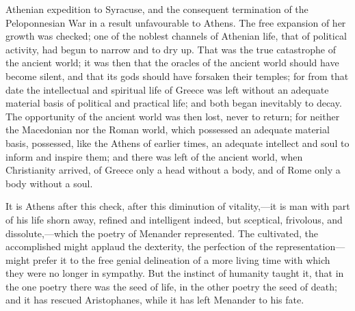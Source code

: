 Athenian expedition to Syracuse, and the consequent termination of the
Peloponnesian War in a result unfavourable to Athens. The free expansion
of her growth was checked; one of the noblest channels of Athenian life,
that of political activity, had begun to narrow and to dry up. That was
the true catastrophe of the ancient world; it was then that the oracles
of the ancient world should have become silent, and that its gods should
have forsaken their temples; for from that date the intellectual and
spiritual life of Greece was left without an adequate material basis of
political and practical life; and both began inevitably to decay. The
opportunity of the ancient world was then lost, never to return; for
neither the Macedonian nor the Roman world, which possessed an adequate
material basis, possessed, like the Athens of earlier times, an adequate
intellect and soul to inform and inspire them; and there was left of the
ancient world, when Christianity arrived, of Greece only a head without
a body, and of Rome only a body without a soul.

It is Athens after this check, after this diminution of vitality,---it
is man with part of his life shorn away, refined and intelligent indeed,
but sceptical, frivolous, and dissolute,---which the poetry of Menander
represented. The cultivated, the accomplished might applaud the
dexterity, the perfection of the representation---might prefer it to the
free genial delineation of a more living time with which they were no
longer in sympathy. But the instinct of humanity taught it, that in the
one poetry there was the seed of life, in the other poetry the seed of
death; and it has rescued Aristophanes, while it has left Menander to
his fate.

